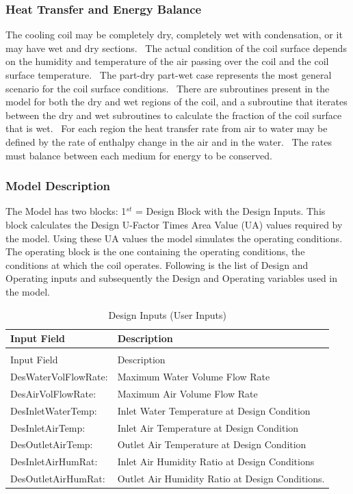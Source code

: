 \subsubsection{Heat Transfer and Energy Balance}\label{heat-transfer-and-energy-balance}

The cooling coil may be completely dry, completely wet with condensation, or it may have wet and dry sections.~ The actual condition of the coil surface depends on the humidity and temperature of the air passing over the coil and the coil surface temperature.~ The part-dry part-wet case represents the most general scenario for the coil surface conditions.~ There are subroutines present in the model for both the dry and wet regions of the coil, and a subroutine that iterates between the dry and wet subroutines to calculate the fraction of the coil surface that is wet.~ For each region the heat transfer rate from air to water may be defined by the rate of enthalpy change in the air and in the water.~ The rates must balance between each medium for energy to be conserved.

\subsubsection{Model Description}\label{model-description-007}

The Model has two blocks: 1\(^{st}\) = Design Block with the Design Inputs. This block calculates the Design U-Factor Times Area Value (UA) values required by the model. Using these UA values the model simulates the operating conditions.~ The operating block is the one containing the operating conditions, the conditions at which the coil operates. Following is the list of Design and Operating inputs and subsequently the Design and Operating variables used in the model.

\begin{longtable}[c]{p{1.79in}p{4.2in}}
\caption{Design Inputs (User Inputs) \label{table:design-inputs-user-inputs}} \tabularnewline
\toprule 
Input Field & Description \tabularnewline
\midrule
\endfirsthead

\caption[]{Design Inputs (User Inputs)} \tabularnewline
\toprule 
Input Field & Description \tabularnewline
\midrule
\endhead

DesWaterVolFlowRate: & Maximum Water Volume Flow Rate \tabularnewline
DesAirVolFlowRate: & Maximum Air Volume Flow Rate \tabularnewline
DesInletWaterTemp: & Inlet Water Temperature at Design Condition \tabularnewline
DesInletAirTemp: & Inlet Air Temperature at Design Condition \tabularnewline
DesOutletAirTemp: & Outlet Air Temperature at Design Condition \tabularnewline
DesInletAirHumRat: & Inlet Air Humidity Ratio at Design Conditions \tabularnewline
DesOutletAirHumRat: & Outlet Air Humidity Ratio at Design Conditions. \tabularnewline
\bottomrule
\end{longtable}

